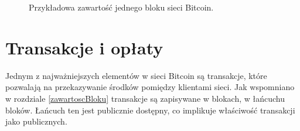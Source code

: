 \documentclass[12pt, twoside, final, openany]{mgr}
\begin{document}
\begin{figure}[H]
	\begin{center}	
	\end{center}
	\caption{Przykładowa zawartość jednego bloku sieci Bitcoin.}
	\label{fig:przykladowyBlok}
\end{figure}
\section{Transakcje i opłaty}
\label{transakcje}

\indent Jednym z najważniejszych elementów w sieci Bitcoin są transakcje, które pozwalają na przekazywanie środków pomiędzy klientami sieci. Jak wspomniano w rozdziale \ref{zawartoscBloku} transakcje są zapisywane w blokach, w łańcuchu bloków. Łańcuch ten jest publicznie dostępny, co implikuje właściwość transakcji jako publicznych. 
\end{document}
